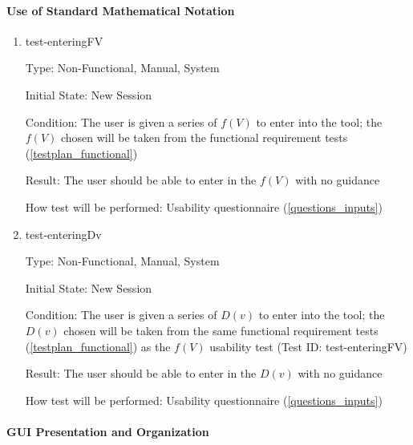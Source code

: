 \documentclass[12pt, titlepage]{article}
\begin{document}
\paragraph{Use of Standard Mathematical Notation}

\begin{enumerate}

\item{test-enteringFV}

Type: Non-Functional, Manual, System
					
Initial State: New Session
					
Condition: The user is given a series of $f(V)$ to enter into the tool; the 
$f(V)$ chosen will be taken from the functional requirement tests 
(\ref{testplan_functional})
					
Result: The user should be able to enter in the $f(V)$ with no guidance
					
How test will be performed: Usability questionnaire (\ref{questions_inputs})\\
					
\item{test-enteringDv}

Type: Non-Functional, Manual, System
					
Initial State: New Session
					
Condition: The user is given a series of $D(v)$ to enter into the tool; the 
$D(v)$ chosen will be taken from the same functional requirement tests 
(\ref{testplan_functional}) as the $f(V)$ usability test (Test ID: 
test-enteringFV)
					
Result: The user should be able to enter in the $D(v)$ with no guidance
					
How test will be performed: Usability questionnaire (\ref{questions_inputs})\\

\end{enumerate}

\paragraph{GUI Presentation and Organization}
\end{document}
